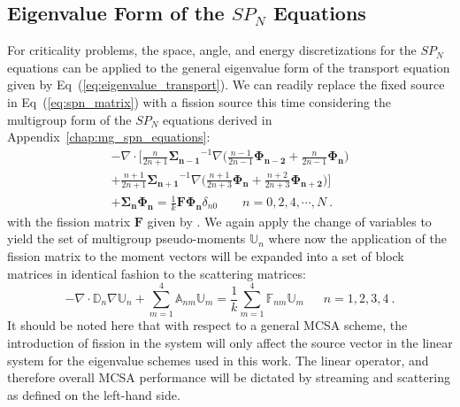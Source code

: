 \subsection{Eigenvalue Form of the $SP_N$ Equations}
\label{subsec:eigenvalue_form}
For criticality problems, the space, angle, and energy discretizations
for the $SP_N$ equations can be applied to the general eigenvalue form
of the transport equation given by
Eq~(\ref{eq:eigenvalue_transport}). We can readily replace the fixed
source in Eq~(\ref{eq:spn_matrix}) with a fission source this time
considering the multigroup form of the $SP_N$ equations derived in
Appendix~\ref{chap:mg_spn_equations}:
\begin{multline}
  -\nabla \cdot \Bigg[\frac{n}{2n+1}\mathbf{\Sigma_{n-1}}^{-1} \nabla
    \Big(\frac{n-1}{2n-1} \mathbf{\Phi_{n-2}} +
    \frac{n}{2n-1}\mathbf{\Phi_n} \Big) \\+
    \frac{n+1}{2n+1}\mathbf{\Sigma_{n+1}}^{-1} \nabla
    \Big(\frac{n+1}{2n+3}\mathbf{\Phi_n} +
    \frac{n+2}{2n+3}\mathbf{\Phi_{n+2}}\Big) \Bigg] \\+
  \mathbf{\Sigma_n} \mathbf{\Phi_n} = \frac{1}{k} \mathbf{F}
  \mathbf{\Phi_n} \delta_{n0} \ \ \ \ \ \ \ \ \ n = 0,2,4,\cdots,N\:.
  \label{eq:multigroup_spn_eigenvalue}
\end{multline}
with the fission matrix $\mathbf{F}$ given by
\cite{evans_simplified_2013}. We again apply the change of variables to
yield the set of multigroup pseudo-moments $\mathbb{U}_n$ where now
the application of the fission matrix to the moment vectors will be
expanded into a set of block matrices in identical fashion to the
scattering matrices:
\begin{equation}
  -\nabla \cdot \mathbb{D}_n \nabla \mathbb{U}_n + \sum_{m=1}^4
  \mathbb{A}_{nm} \mathbb{U}_m = \frac{1}{k} \sum_{m=1}^4
  \mathbb{F}_{nm} \mathbb{U}_m\ \ \ \ \ \ \ n = 1,2,3,4\:.
  \label{eq:spn_fission_matrix}
\end{equation}
It should be noted here that with respect to a general MCSA scheme,
the introduction of fission in the system will only affect the source
vector in the linear system for the eigenvalue schemes used in this
work. The linear operator, and therefore overall MCSA performance will
be dictated by streaming and scattering as defined on the left-hand
side.

